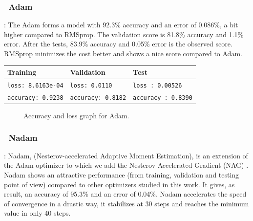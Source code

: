 \documentclass[lnbip]{svmultln}
\newcommand{\myfloatalign}{\centering}
\begin{document}
	\subsubsection*{\qquad \textbullet \ \textbf{Adam}}:
	The Adam forms a model with 92.3\% accuracy and an error of 0.086\%, a bit higher compared to RMSprop. The validation score is 81.8\% accuracy and 1.1\% error. After the tests, 83.9\% accuracy and 0.05\% error is the observed score. RMSprop minimizes the cost better and shows a nice score compared to Adam.
	\begin{table}[H]
		\centering
		\begin{tabular}{l|l|l}
			\hline
			\textbf{Training} & \textbf{Validation} & \textbf{Test} \\
			\hline
			\texttt{loss: 8.6163e-04} & \texttt{loss: 0.0110} & \texttt{loss : 0.00526} \\
			\texttt{accuracy: 0.9238} & \texttt{accuracy: 0.8182} & \texttt{accuracy : 0.8390} \\
			\hline
		\end{tabular}
	\end{table}
	\begin{figure}[H]
		\myfloatalign
		 \quad
		
		\caption[]{Accuracy and loss graph for Adam.}
	\end{figure}

	
	
	\subsubsection*{\qquad \textbullet \ \textbf{Nadam}}:
	Nadam, (Nesterov-accelerated Adaptive Moment Estimation), 
	is an extension of the Adam optimizer to which we add the Nesterov Accelerated Gradient (NAG) \cite[]{ruder2016overview}.
	Nadam shows an attractive performance (from training, validation and testing point of view) compared to other optimizers studied in this work. It gives, as result, an accuracy of 95.3\%  and an error of 0.04\%. Nadam accelerates the speed of convergence in a drastic way, it stabilizes at 30 steps and reaches the minimum value in only 40 steps.
	
\end{document}
